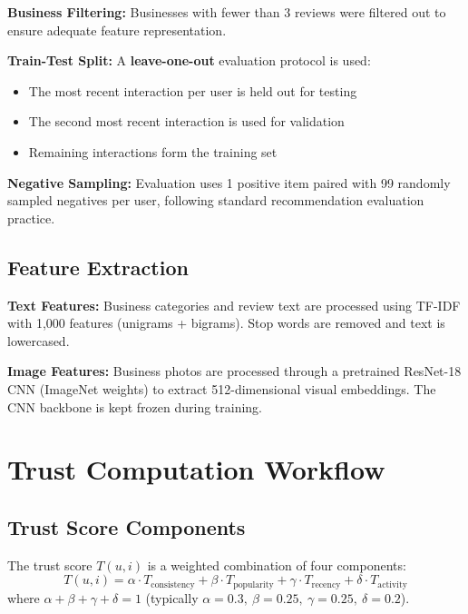 \documentclass[12pt,a4paper]{report}
\begin{document}
{\textbf{Business Filtering:} Businesses with fewer than 3 reviews were filtered out to ensure adequate feature representation.

\textbf{Train-Test Split:} A \textbf{leave-one-out} evaluation protocol is used:
\begin{itemize}
    \item The most recent interaction per user is held out for testing
    \item The second most recent interaction is used for validation
    \item Remaining interactions form the training set
\end{itemize}

\textbf{Negative Sampling:} Evaluation uses 1 positive item paired with 99 randomly sampled negatives per user, following standard recommendation evaluation practice.

\section{Feature Extraction}

\textbf{Text Features:} Business categories and review text are processed using TF-IDF with 1,000 features (unigrams + bigrams). Stop words are removed and text is lowercased.

\textbf{Image Features:} Business photos are processed through a pretrained ResNet-18 CNN (ImageNet weights) to extract 512-dimensional visual embeddings. The CNN backbone is kept frozen during training.

\chapter{Trust Computation Workflow}
\label{appendix:trust}

\section{Trust Score Components}

The trust score $T(u,i)$ is a weighted combination of four components:
\begin{equation}
T(u,i) = \alpha \cdot T_{\text{consistency}} + \beta \cdot T_{\text{popularity}} + \gamma \cdot T_{\text{recency}} + \delta \cdot T_{\text{activity}}
\end{equation}
where $\alpha + \beta + \gamma + \delta = 1$ (typically $\alpha=0.3,\ \beta=0.25,\ \gamma=0.25,\ \delta=0.2$).

}
\end{document}
